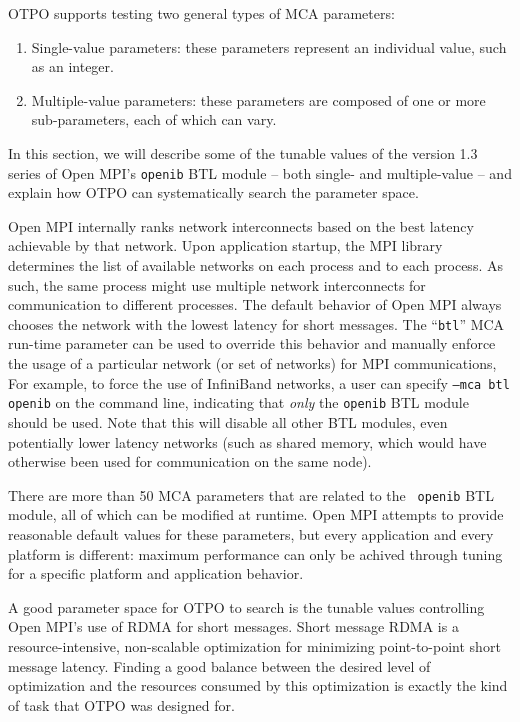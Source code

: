 \label{sec:motivation}

OTPO supports testing two general types of MCA parameters:

\begin{enumerate}
\item Single-value parameters: these parameters represent an
  individual value, such as an integer.
\item Multiple-value parameters: these parameters are composed of
  one or more sub-parameters, each of which can vary.
\end{enumerate}

In this section, we will describe some of the tunable values of the
version 1.3 series of Open MPI's {\tt openib} BTL module -- both
single- and multiple-value -- and explain how OTPO can systematically
search the parameter space.

Open MPI internally ranks network interconnects based on the best
latency achievable by that network. Upon application startup, the MPI
library determines the list of available networks on each process and
to each process.  As such, the same process might use multiple network
interconnects for communication to different processes. The default
behavior of Open MPI always chooses the network with the lowest
latency for short messages.  The ``{\tt btl}'' MCA run-time parameter
can be used to override this behavior and manually enforce the usage
of a particular network (or set of networks) for MPI communications,
For example, to force the use of InfiniBand networks, a user can
specify {\tt --mca btl openib} on the command line, indicating that
{\em only} the {\tt openib} BTL module should be used.  Note that this
will disable all other BTL modules, even potentially lower latency
networks (such as shared memory, which would have otherwise been used
for communication on the same node).

There are more than 50 MCA parameters that are related to the {\tt
  openib} BTL module, all of which can be modified at runtime.  Open
MPI attempts to provide reasonable default values for these
parameters, but every application and every platform is different:
maximum performance can only be achived through tuning for a specific
platform and application behavior.

A good parameter space for OTPO to search is the tunable values
controlling Open MPI's use of RDMA for short messages.  Short message
RDMA is a resource-intensive, non-scalable optimization for minimizing
point-to-point short message latency.  Finding a good balance between
the desired level of optimization and the resources consumed by this
optimization is exactly the kind of task that OTPO was designed for.

